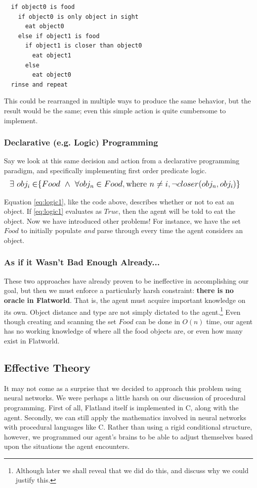 \begin{verbatim}
  if object0 is food
    if object0 is only object in sight
      eat object0
    else if object1 is food
      if object1 is closer than object0
        eat object1 
      else
        eat object0
  rinse and repeat
\end{verbatim}

This could be rearranged in multiple ways to produce the same behavior,
but the result would be the same; even this simple action is quite cumbersome
to implement.

\subsubsection{Declarative (e.g. Logic) Programming}
Say we look at this same decision and action from a declarative programming
paradigm, and specifically implementing first order predicate logic.
\begin{equation} \label{eq:logic1}
  \large
  \begin{aligned}
    \exists\ obj_i \in &\{Food\ \wedge\ \forall obj_n \in Food, \text{where }
    n \neq i, \neg closer(obj_n,obj_i)\}
  \end{aligned}
\end{equation}

Equation \eqref{eq:logic1}, like the code above, describes whether or 
not to eat an object. If \eqref{eq:logic1} evaluates as $True$, then the agent 
will be told to eat the object. Now we have introduced other problems! For 
instance, we have the set $Food$ to initially populate \emph{and} parse 
through every time the agent considers an object. 

\subsubsection{As if it Wasn't Bad Enough Already...}
These two approaches have already proven to be ineffective in accomplishing
our goal, but then we must enforce a particularly harsh constraint: 
\textbf{there is no oracle in Flatworld}. That is, the agent must acquire
important knowledge on its own. Object distance and type are not simply
dictated to the agent.\footnote{Although later we shall reveal that we did
do this, and discuss why we could justify this.} Even though creating and
scanning the set $Food$ can be done in $O(n)$ time, our agent has no working
knowledge of where all the food objects are, or even how many exist
in Flatworld.


\subsection{Effective Theory}
It may not come as a surprise that we decided to approach this problem using
neural networks. We were perhaps a little harsh on our discussion of 
procedural programming. First of all, Flatland itself is implemented in C,
along with the agent. Secondly, we can still apply the mathematics involved
in neural networks with procedural languages like C. Rather than using a
rigid conditional structure, however, we programmed our agent's brains to
be able to adjust themselves based upon the situations the agent encounters.

